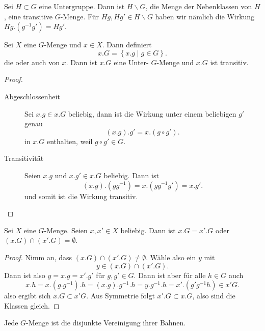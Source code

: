 \begin{example}
    Sei $H\subset G$ eine Untergruppe. Dann ist $H \backslash G$, die Menge der Nebenklassen von  $H$, eine transitive  $G$-Menge. Für  $Hg, Hg' \in  H \backslash G$ haben wir nämlich die Wirkung $Hg.(g^{-1}g') = Hg'$.
\end{example}

\begin{lemmadef}[Bahn]\label{def:bahn-orbit}
    Sei $X$ eine  $G$-Menge und  $x\in X$. Dann definiert
    \[
    x.G = \left \{x.g \mid  g\in G\right\} 
    .\] 
    die  oder auch  von $x$. Dann ist  $x.G$ eine Unter- $G$-Menge und  $x.G$ ist transitiv.
\end{lemmadef}
\begin{proof}
    \begin{description}
        \item[Abgeschlossenheit] Sei $x.g \in x.G$ beliebig, dann ist die Wirkung unter einem beliebigen $g'$ genau
            \[
                (x.g).g' = x.(g \circ g')
            .\] 
            in $x.G$ enthalten, weil  $g \circ  g'\in G$.
        \item[Transitivität] Seien $x.g$ und  $x.g'\in x.G$ beliebig. Dann ist
            \[
                (x.g).(gg^{-1}) = x.(gg^{-1}g') = x.g'
            .\] 
            und somit ist die Wirkung transitiv.
    \end{description}
\end{proof}

\begin{lemma}
Sei $X$ eine  $G$-Menge. Seien $x,x' \in X$ beliebig. Dann ist $x.G = x'.G$ oder  $(x.G) \cap  (x'.G) = \emptyset$.
\end{lemma}

\begin{proof}
    Nimm an, dass $(x.G) \cap  (x'.G) \neq  \emptyset$. Wähle also ein $y$ mit 
     \[
         y\in  (x.G) \cap  (x'.G)
    .\] 
    Dann ist also $y = x.g = x'.g'$ für  $g,g' \in G$. Dann ist aber für alle $h\in G$ auch
    \[
        x.h = x.(g.g^{-1}).h = (x.g).g^{-1}.h = y.g^{-1}.h = x'.(g'g^{-1}h) \in x'G
    .\] 
    also ergibt sich $x.G \subset x'G$. Aus Symmetrie folgt $x'.G \subset x.G$, also sind die Klassen gleich.
\end{proof}

\begin{dcorollary}\label{cor:g-menge-ist-disjunkte-vereinigung-der-bahnen}
    Jede $G$-Menge ist die disjunkte Vereinigung ihrer Bahnen.
\end{dcorollary}

